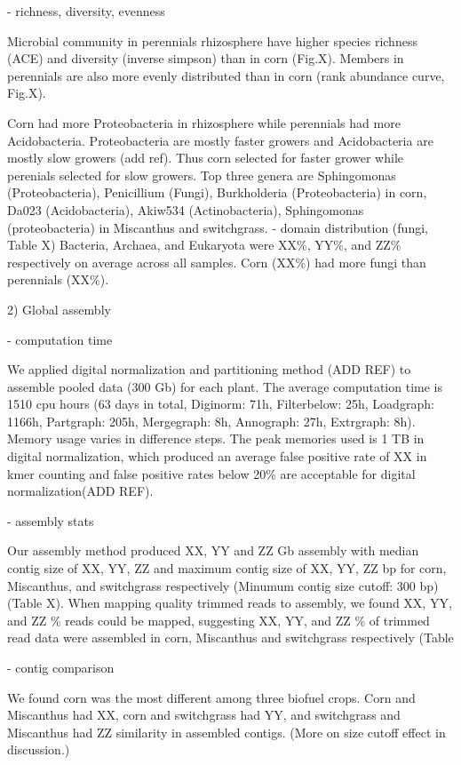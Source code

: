 \documentclass[12pt]{article}
\begin{document}
- richness, diversity, evenness

Microbial community in perennials rhizosphere have higher species richness (ACE) and diversity (inverse simpson) than in corn (Fig.X). Members in perennials are also more evenly distributed than in corn (rank abundance curve, Fig.X).

Corn had more Proteobacteria in rhizosphere while perennials had more Acidobacteria. Proteobacteria are mostly faster growers and Acidobacteria are mostly slow growers (add ref). Thus corn selected for faster grower while perenials selected for slow growers. Top three genera are Sphingomonas (Proteobacteria), Penicillium (Fungi), Burkholderia (Proteobacteria) in corn, Da023 (Acidobacteria), Akiw534 (Actinobacteria), Sphingomonas (proteobacteria) in Miscanthus and switchgrass. 
- domain distribution (fungi, Table X)
Bacteria, Archaea, and Eukaryota were XX\%, YY\%, and ZZ\% respectively on average across all samples. Corn (XX\%) had more fungi than perennials (XX\%).
  
2) Global assembly

- computation time

We applied digital normalization and partitioning method (ADD REF) to assemble pooled data (300 Gb) for each plant. The average computation time is 1510 cpu hours (63 days in total, Diginorm: 71h, Filterbelow: 25h, Loadgraph: 1166h, Partgraph: 205h, Mergegraph: 8h, Annograph: 27h, Extrgraph: 8h). Memory usage varies in difference steps. The peak memories used is 1 TB in digital normalization, which produced an average false positive rate of XX in kmer counting and false positive rates below 20\% are acceptable for digital normalization(ADD REF). 

- assembly stats

Our assembly method produced  XX, YY and ZZ Gb assembly with median contig size of XX, YY, ZZ and maximum contig size of XX, YY, ZZ bp for corn, Miscanthus, and switchgrass respectively (Minumum contig size cutoff: 300 bp)(Table X). When mapping quality trimmed reads to assembly, we found XX, YY, and ZZ \% reads could be mapped, suggesting XX, YY, and ZZ \% of trimmed read data were assembled in corn, Miscanthus and switchgrass respectively (Table

- contig comparison

We found corn was the most different among three biofuel crops.  Corn and Miscanthus had XX, corn and switchgrass had YY, and switchgrass and Miscanthus had ZZ similarity in assembled contigs. (More on size cutoff effect in discussion.)
\end{document}
